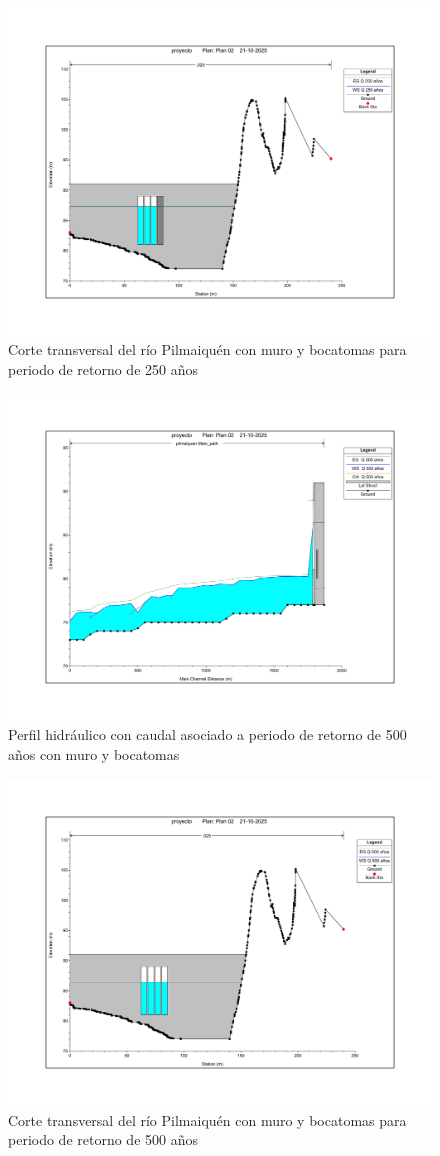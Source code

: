 \documentclass{article} %
\begin{document}
\begin{figure}[H]
    \centering
    \includegraphics[width=0.6\linewidth]{imagenes/corte_250_cb.pdf}
    \caption{Corte transversal del río Pilmaiquén con muro y bocatomas para periodo de retorno de 250 años}
\end{figure}

\begin{figure}[H]
    \centering
    \includegraphics[width=0.6\linewidth]{imagenes/perfil_500_cb.pdf}
    \caption{Perfil hidráulico con caudal asociado a periodo de retorno de 500 años con muro y bocatomas}
\end{figure}

\begin{figure}[H]
    \centering
    \includegraphics[width=0.6\linewidth]{imagenes/corte_500_cb.pdf}
    \caption{Corte transversal del río Pilmaiquén con muro y bocatomas para periodo de retorno de 500 años}
\end{figure}
\end{document}
